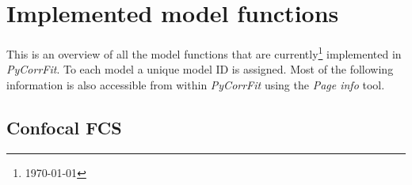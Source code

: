 \section{Implemented model functions}
\label{sec:imple}
This is an overview of all the model functions that are currently\footnote{\today} implemented in \textit{PyCorrFit}. To each model a unique model ID is assigned. Most of the following information is also accessible from within \textit{PyCorrFit} using the \textit{Page info} tool.

\subsection{Confocal FCS}
\label{sec:imple.confo}





